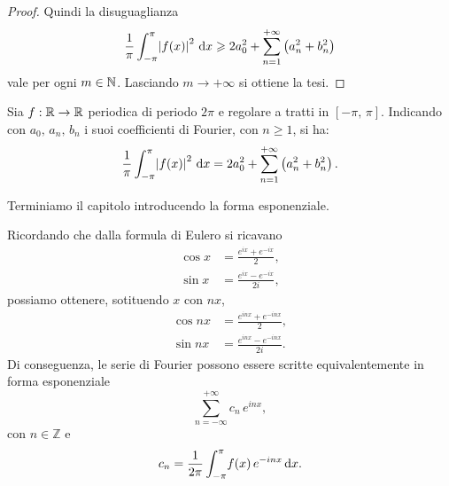\documentclass[../../analisi2]{subfiles}
\begin{document}
\begin{proof}
            Quindi la disuguaglianza
            \[
                \frac{1}{\pi} \int_{-\pi}^{\pi} \! \left|f(x)\right|^2 \, \mathrm{d}x \geqslant 2 a_0^2 + \sum_{n = 1}^{+\infty} \left(a_n^2 + b_n^2\right)
            \]
            vale per ogni \(m \in \mathbb{N}\). Lasciando \(m \to +\infty\) si ottiene la tesi.
        \end{proof}

        \begin{teorema}
            Sia \(f : \mathbb{R} \to \mathbb{R}\) periodica di periodo \(2\pi\) e regolare a tratti in \([-\pi, \, \pi]\). Indicando con
            \(a_0, \, a_n, \, b_n\) i suoi coefficienti di Fourier, con \(n \geqslant 1\), si ha:
            \[
                \frac{1}{\pi} \int_{-\pi}^{\pi} \! \left|f(x)\right|^2 \, \mathrm{d}x = 2 a_0^2 + \sum_{n = 1}^{+\infty} \left(a_n^2 + b_n^2\right).
            \]
        \end{teorema}

        Terminiamo il capitolo introducendo la forma esponenziale.

        \begin{definizione}
            Ricordando che dalla formula di Eulero si ricavano
            \begin{align*}
                \cos x &= \frac{e^{ix} + e^{-ix}}{2},\\
                \sin x &= \frac{e^{ix} - e^{-ix}}{2i},
            \end{align*}
            possiamo ottenere, sotituendo \(x\) con \(nx\),
            \begin{align*}
                \cos nx &= \frac{e^{inx} + e^{-inx}}{2},\\
                \sin nx &= \frac{e^{inx} - e^{-inx}}{2i}.
            \end{align*}
            Di conseguenza, le serie di Fourier possono essere scritte equivalentemente in forma esponenziale
            \[
                \sum_{n = -\infty}^{+\infty} c_n \, e^{inx},
            \]
            con \(n \in \mathbb{Z}\) e
            \[
                c_n = \frac{1}{2\pi} \int_{-\pi}^{\pi} \! f(x) \, e^{-inx} \, \mathrm{d}x.
            \]
        \end{definizione}
\end{document}

